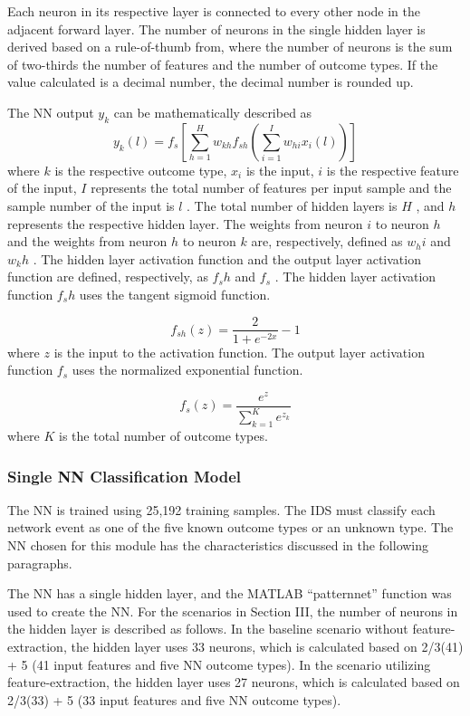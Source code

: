 \documentclass[12pt]{article}
\theoremstyle{definition}
\begin{document}
			Each neuron in its respective layer is connected to every other node in the adjacent forward layer. The number of neurons in the single hidden layer is derived based
			on a rule-of-thumb from, where the number of neurons is the sum of two-thirds the number of features and the number of outcome types. If the value calculated is a decimal number, the decimal number is rounded up.
			
			The NN output $ y_{k}$ can be mathematically described as
			\begin{equation}
				y_k(l) = f_s[\sum_{h=1}^{H} w_{kh} f_{sh}(\sum_{i=1}^{I} w_{hi} x_i(l))]
			\end{equation}
			where $ k $ is the respective outcome type, $ x_i $ is the input, $ i $ is the respective feature of the input, $ I $ represents the total number of features per input sample and the sample number of the input is $ l $ . The total number of hidden layers is $ H $ , and $ h $ represents the respective hidden layer. The weights from neuron $ i $ to neuron $ h $ and the weights from neuron $ h $ to neuron $ k $ are, respectively, defined as $ w_hi $  and $ w_kh $ . The hidden layer activation function and the output layer activation function are defined, respectively, as $ f_sh $ and $ f_s $ . The hidden layer activation function $ f_sh $ uses the tangent sigmoid function.
			
			\begin{equation}
				f_{sh}(z) = \frac{2}{1 + e^{-2x}} - 1
			\end{equation}
			where $ z $ is the input to the activation function. The output layer activation function $ f_s $ uses the normalized exponential function.
			
			\begin{equation}
				f_s(z) = \frac{e^z}{\sum_{k=1}^{K} e^{z_k}}
			\end{equation}
			where $ K $ is the total number of outcome types.
			\subsubsection{Single NN Classification Model}
			The NN is trained using 25,192 training samples. The IDS must classify each
			network event as one of the five known outcome types or an unknown type. The NN
			chosen for this module has the characteristics discussed in the following paragraphs.
			
			The NN has a single hidden layer, and the MATLAB “patternnet” function was
			used to create the NN. For the scenarios in Section III, the number of neurons in the
			hidden layer is described as follows. In the baseline scenario without feature-extraction,
			the hidden layer uses 33 neurons, which is calculated based on 2/3(41) + 5 (41 input
			features and five NN outcome types). In the scenario utilizing feature-extraction, the
			hidden layer uses 27 neurons, which is calculated based on 2/3(33) + 5 (33 input features
			and five NN outcome types).
			
\end{document}
